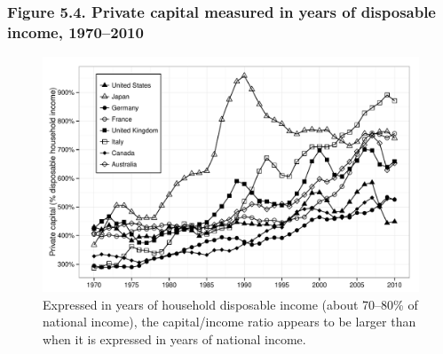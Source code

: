 \documentclass[t]{beamer}\usepackage[]{graphicx}\usepackage[]{color}
\newenvironment{knitrout}{}{} %
\begin{document}
\begin{frame}[label=Figure_5_4]
\frametitle{Figure 5.4. Private capital measured in years of disposable income, 1970--2010}
\begin{figure}[t]
\begin{minipage}[b]{\textwidth}
\centering
\begin{knitrout}\footnotesize
{}\color{fgcolor}

{\centering \includegraphics[width=1\linewidth]{figures/bw/Figure_5_4} 

}



\end{knitrout}
\caption{Expressed in years of household disposable income (about 70--80\% of national income), the capital/income ratio appears to be larger than when it is expressed in years of national income.}
\end{minipage}
\end{figure}
\end{frame}
\end{document}
